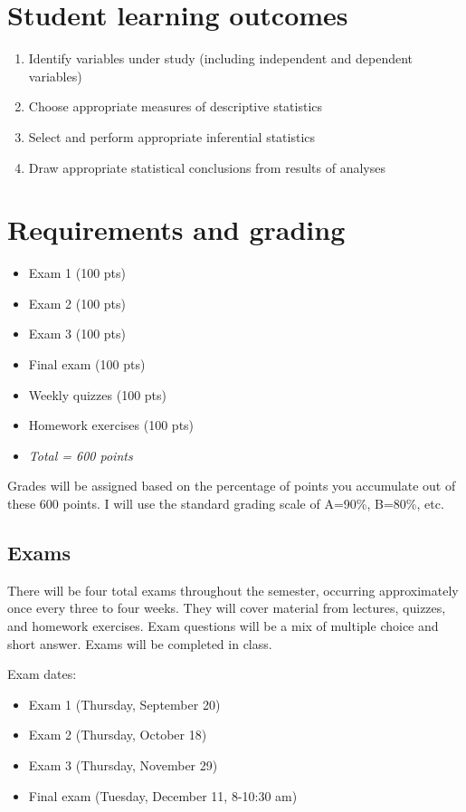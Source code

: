 \documentclass[10pt]{article}
\begin{document}
\section*{Student learning outcomes}
\label{sec:orge2e323d}
\begin{enumerate}
\item Identify variables under study (including independent and dependent variables)
\item Choose appropriate measures of descriptive statistics
\item Select and perform appropriate inferential statistics
\item Draw appropriate statistical conclusions from results of analyses
\end{enumerate}

\section*{Requirements and grading}
\label{sec:orgb0544b7}
\begin{itemize}
\item Exam 1 (100 pts)
\item Exam 2 (100 pts)
\item Exam 3 (100 pts)
\item Final exam (100 pts)
\item Weekly quizzes (100 pts)
\item Homework exercises (100 pts)
\item \emph{Total = 600 points}
\end{itemize}

Grades will be assigned based on the percentage of points you accumulate out of these 600 points.  I will use the standard grading scale of A=90\%, B=80\%, etc.

\subsection*{Exams}
\label{sec:org31a338c}
There will be four total exams throughout the semester, occurring approximately once every three to four weeks.  They will cover material from lectures, quizzes, and homework exercises.  Exam questions will be a mix of multiple choice and short answer.  Exams will be completed in class.

Exam dates:

\begin{itemize}
\item Exam 1 (Thursday, September 20)
\item Exam 2 (Thursday, October 18)
\item Exam 3 (Thursday, November 29)
\item Final exam (Tuesday, December 11, 8-10:30 am)
\end{itemize}
\end{document}
